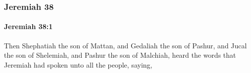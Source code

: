 	\subsubsection{Jeremiah 38} %
		\label{JEREMIAH-38}

		\paragraph{Jeremiah 38:1} %
			\label{JEREMIAH-38-1}

			Then Shephatiah the son of Mattan, and Gedaliah the son of Pashur, and Jucal the son of Shelemiah, and Pashur the son of Malchiah, heard the words that Jeremiah had spoken unto all the people, saying,


